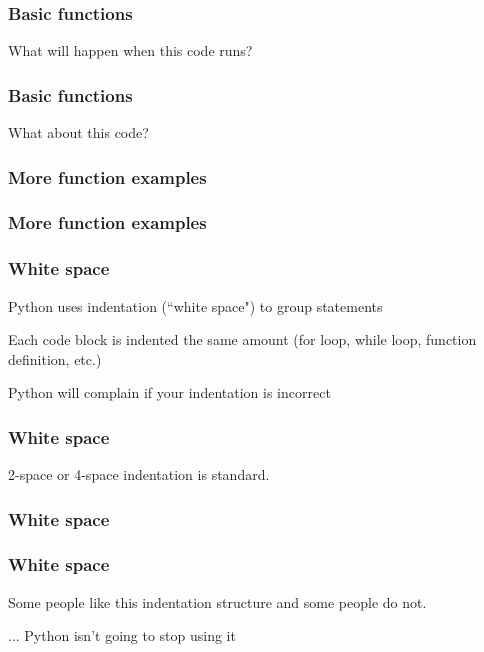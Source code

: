 \documentclass{beamer}
\begin{document}
\begin{frame}
\frametitle{Basic functions}

What will happen when this code runs?



\end{frame}

\begin{frame}
\frametitle{Basic functions}

What about this code?

\end{frame}


\begin{frame}
\frametitle{More function examples}

\end{frame}

\begin{frame}
\frametitle{More function examples}

\end{frame}


\begin{frame}
\frametitle{White space}

Python uses indentation (``white space") to group statements

\vspace{0.15in}

Each code block is indented the same amount (for loop, while loop, function definition, etc.)

\vspace{0.15in}

Python will complain if your indentation is incorrect
\end{frame}

\begin{frame}
\frametitle{White space}


2-space or 4-space indentation is standard.

\end{frame}


\begin{frame}
\frametitle{White space}


\end{frame}

\begin{frame}
\frametitle{White space}

Some people like this indentation structure and some people do not.

\vspace{0.2in}

... Python isn't going to stop using it

\end{frame}
\end{document}
